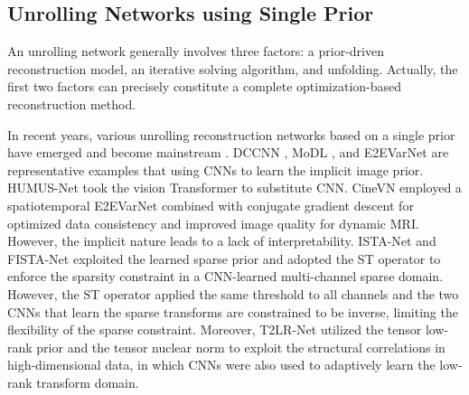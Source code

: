 \subsection{Unrolling Networks using Single Prior}
An unrolling network \cite{LeCun2010unroll, liang2020deep, monga2021algorithm} generally involves three factors: a prior-driven reconstruction model, an iterative solving algorithm, and unfolding. Actually, the first two factors can precisely constitute a complete optimization-based reconstruction method. 


In recent years, various unrolling reconstruction networks based on a single prior have emerged and become mainstream \cite{muckley2021results}. DCCNN \cite{ref_DCCNN}, MoDL \cite{aggarwal2018modl}, and E2EVarNet \cite{sriram2020end} are representative examples that using CNNs to learn the implicit image prior. HUMUS-Net \cite{fabian2022humus} took the vision Transformer to substitute CNN. 
CineVN \cite{vornehm2025cinevn} employed a spatiotemporal E2EVarNet combined with conjugate gradient descent for optimized data consistency and improved image quality for dynamic MRI.
However, the implicit nature leads to a lack of interpretability. ISTA-Net \cite{ref_ISTANET} and FISTA-Net \cite{xiang2021fista} exploited the learned sparse prior and adopted the ST operator \cite{donoho1995noising} to enforce the sparsity constraint in a CNN-learned multi-channel sparse domain. However, the ST operator applied the same threshold to all channels and the two CNNs that learn the sparse transforms are constrained to be inverse, limiting the flexibility of the sparse constraint. 
Moreover, T2LR-Net \cite{zhang2024t2lr,zhang2023tlr} utilized the tensor low-rank prior and the tensor nuclear norm \cite{ref_tsvd} to exploit the structural correlations in high-dimensional data, in which CNNs were also used to adaptively learn the low-rank transform domain. %

